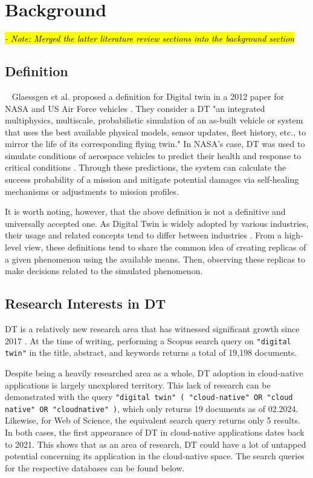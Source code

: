 \chapter{Background}

\hl{\textit{- Note: Merged the latter literature review sections into the background section}}  

\section{Definition}

\par{~}
Glaessgen et al. proposed a definition for Digital twin in a 2012 paper for NASA and US Air Force vehicles \cite{glaessgen_digital_2012}. They consider a DT "an integrated multiphysics, multiscale, probabilistic simulation of an as-built vehicle or system that uses the best available physical models, sensor updates, fleet history, etc., to mirror the life of its corresponding flying twin." In NASA's case, DT was used to simulate conditions of aerospace vehicles to predict their health and response to critical conditions \cite{glaessgen_digital_2012}. Through these predictions, the system can calculate the success probability of a mission and mitigate potential damages via self-healing mechanisms or adjustments to mission profiles.

It is worth noting, however, that the above definition is not a definitive and universally accepted one. As Digital Twin is widely adopted by various industries, their usage and related concepts tend to differ between industries \cite{jiang_industrial_2021}. From a high-level view, these definitions tend to share the common idea of creating replicas of a given phenomenon using the available means. Then, observing these replicas to make decisions related to the simulated phenomenon.



\section{Research Interests in DT}

DT is a relatively new research area that has witnessed significant growth since 2017 \cite{ketzler_digital_2020}. At the time of writing, performing a Scopus search query on \texttt{"digital twin"} in the title, abstract, and keywords returns a total of 19,198 documents.

Despite being a heavily researched area as a whole, DT adoption in cloud-native applications is largely unexplored territory. This lack of research can be demonstrated with the query \texttt{"digital twin" ( "cloud-native" OR "cloud native" OR "cloudnative" )}, which only returns 19 documents as of 02.2024. Likewise, for Web of Science, the equivalent search query returns only 5 results. In both cases, the first appearance of DT in cloud-native applications dates back to 2021. This shows that as an area of research, DT could have a lot of untapped potential concerning its application in the cloud-native space. The search queries for the respective databases can be found below.


